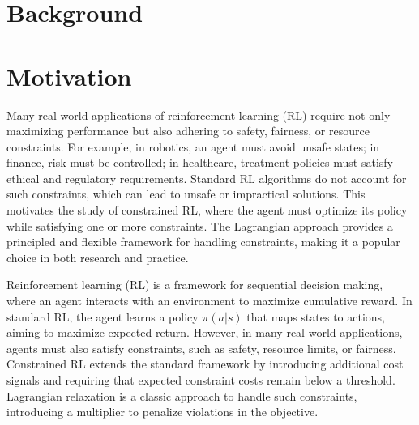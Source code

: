 \maketitle

\begin{abstract}
We present a compact, reproducible study of Lagrangian-constrained policy optimization in a synthetic bandit-like setting. The goal is to provide a minimal, well-documented scaffold suitable for experimentation and pedagogy: the codebase implements a Gaussian MLP policy, a value baseline, a Lagrangian penalty on expected constraint violations, and utilities for reproducible experiments and checkpointing. This report describes the method, experimental protocol, and provides templates and placeholders to collect and present results.
\end{abstract}

\IEEEpeerreviewmaketitle

\section{Background}
\section{Motivation}
Many real-world applications of reinforcement learning (RL) require not only maximizing performance but also adhering to safety, fairness, or resource constraints. For example, in robotics, an agent must avoid unsafe states; in finance, risk must be controlled; in healthcare, treatment policies must satisfy ethical and regulatory requirements. Standard RL algorithms do not account for such constraints, which can lead to unsafe or impractical solutions. This motivates the study of constrained RL, where the agent must optimize its policy while satisfying one or more constraints. The Lagrangian approach provides a principled and flexible framework for handling constraints, making it a popular choice in both research and practice.

Reinforcement learning (RL) is a framework for sequential decision making, where an agent interacts with an environment to maximize cumulative reward. In standard RL, the agent learns a policy $\pi(a|s)$ that maps states to actions, aiming to maximize expected return. However, in many real-world applications, agents must also satisfy constraints, such as safety, resource limits, or fairness. Constrained RL extends the standard framework by introducing additional cost signals and requiring that expected constraint costs remain below a threshold. Lagrangian relaxation is a classic approach to handle such constraints, introducing a multiplier to penalize violations in the objective.

